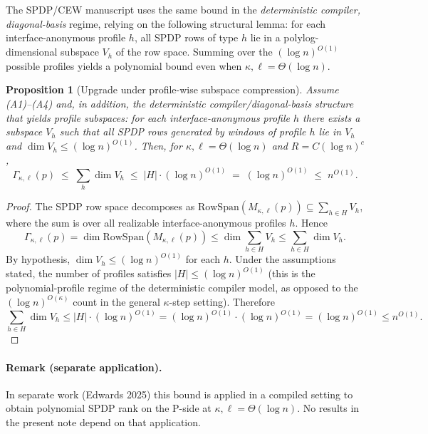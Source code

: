 \documentclass[12pt]{article}
\newtheorem{proposition}[theorem]{Proposition}
\theoremstyle{definition}
\theoremstyle{remark}
\begin{document}
The SPDP/CEW manuscript \citep{Edwards2025} uses the same bound in the \emph{deterministic compiler,
diagonal-basis} regime, relying on the following structural lemma:
for each interface-anonymous profile $h$, all SPDP rows of type $h$ lie in a
polylog-dimensional subspace $V_h$ of the row space. Summing over the
$(\log n)^{O(1)}$ possible profiles yields a polynomial bound even when
$\kappa,\ell=\Theta(\log n)$.

\begin{proposition}[Upgrade under profile-wise subspace compression]
\label{prop:upgrade-width-rank}
Assume \textnormal{(A1)}--\textnormal{(A4)} and, in addition, the deterministic
compiler\slash diagonal-basis structure that yields \emph{profile subspaces}:
for each interface-anonymous profile $h$ there exists a subspace $V_h$ such that
all SPDP rows generated by windows of profile $h$ lie in $V_h$ and
$\dim V_h\le (\log n)^{O(1)}$.
Then, for $\kappa,\ell=\Theta(\log n)$ and $R=C(\log n)^c$,
\[
  \Gamma_{\kappa,\ell}(p)
  \;\le\;
  \sum_{h} \dim V_h
  \;\le\;
  |H|\cdot (\log n)^{O(1)}
  \;=\;
  (\log n)^{O(1)}
  \;\le\;
  n^{O(1)}.
\]
\end{proposition}

\begin{proof}
The SPDP row space decomposes as $\mathrm{RowSpan}(M_{\kappa,\ell}(p)) \subseteq \sum_{h \in H} V_h$,
where the sum is over all realizable interface-anonymous profiles $h$. Hence
\[
\Gamma_{\kappa,\ell}(p) = \dim \mathrm{RowSpan}(M_{\kappa,\ell}(p)) \le \dim \sum_{h \in H} V_h \le \sum_{h \in H} \dim V_h.
\]
By hypothesis, $\dim V_h \le (\log n)^{O(1)}$ for each $h$. Under the assumptions stated,
the number of profiles satisfies $|H| \le (\log n)^{O(1)}$ (this is the polynomial-profile
regime of the deterministic compiler model, as opposed to the $(\log n)^{O(\kappa)}$ count in
the general $\kappa$-step setting). Therefore
\[
\sum_{h \in H} \dim V_h \le |H| \cdot (\log n)^{O(1)} = (\log n)^{O(1)} \cdot (\log n)^{O(1)} = (\log n)^{O(1)} \le n^{O(1)}.
\]
\end{proof}

\paragraph{Remark (separate application).}
In separate work (Edwards 2025) this bound is applied in a compiled setting to obtain
polynomial SPDP rank on the P-side at $\kappa,\ell=\Theta(\log n)$. No results in the present
note depend on that application.
\end{document}
